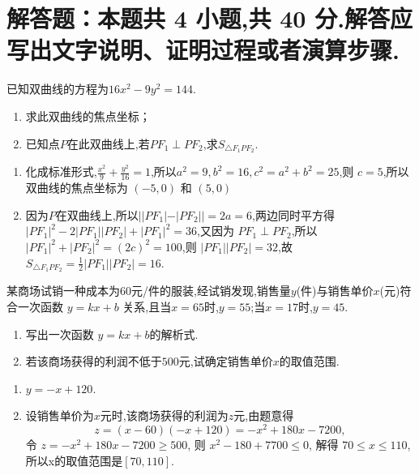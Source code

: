 \documentclass{exam-zh}
\begin{document}
\section{解答题：本题共 4 小题,共 40 分.解答应写出文字说明、证明过程或者演算步骤.}

\begin{problem}[points = 8]
已知双曲线的方程为$16x^2-9y^2=144$.
\begin{enumerate}
    \item 求此双曲线的焦点坐标；
    \item 已知点$P$在此双曲线上,若$PF_1 \perp  PF_2$,求$S_{\triangle F_1PF_2}$.
\end{enumerate}

\end{problem}

\begin{solution}
\begin{enumerate}
    \item 化成标准形式,$\frac{x^2}{9}+\frac{y^2}{16}=1$,所以$a^2 = 9,b^2 =16,c^2 = a^2+b^2 = 25$,则 $c = 5$,所以双曲线的焦点坐标为 $(-5,0)$ 和 $(5,0)$ 
    \item 因为$P$在双曲线上,所以$||PF_1|-|PF_2||=2a = 6$,两边同时平方得$|PF_1|^2-2|PF_1||PF_2|+|PF_1|^2 = 36$,又因为 $PF_1\perp PF_2$,所以$|PF_1|^2+|PF_2|^2 =(2c)^2 =100$,则 $|PF_1||PF_2| =32$,故$S_{\triangle F_1PF_2} =\frac{1}{2} |PF_1||PF_2|  = 16 $.

\end{enumerate}
    
\end{solution}
  
\begin{problem}[points = 8]
某商场试销一种成本为$60$元/件的服装,经试销发现,销售量$y$(件)与销售单价$x$(元)符合一次函数 $y = k x+b$ 关系,且当$x=65$时,$y=55$;当$x = 17$时,$y=45$.
    \begin{enumerate}
        \item 写出一次函数 $y = k x +b $的解析式.
        \item 若该商场获得的利润不低于$500$元,试确定销售单价$x$的取值范围.

    \end{enumerate}
\end{problem}
\begin{solution}
    \begin{enumerate}
        \item $y = -x +120$.
        \item 设销售单价为$x$元时,该商场获得的利润为$z$元,由题意得\[
        z = (x-60) (-x+120) = -x^2 +180x-7200,\]
        令 $z = -x^2 +180x-7200 \ge 500$, 则 $x^2 -180+7700 \le 0$, 解得 $70 \le x\le 110$,
        所以x的取值范围是$[70,110]$.

    
    \end{enumerate}
        
\end{solution}
\end{document}
